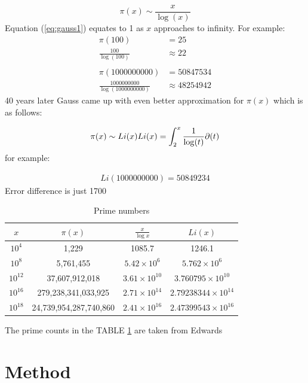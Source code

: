 \documentclass[12pt,journal,compsoc]{IEEEtran}
\begin{document}
	\begin{equation}
		\pi(x)\sim \frac{x}{\log(x)}
	\end{equation}
Equation (\ref{eq:gauss1}) equates to 1 as $x$ approaches to infinity. For example: 
	\begin{align*}
			\pi(100) &= 25 \\
			\frac{100}{\log(100)} &\approx 22 \\\\
			\pi(1000000000) &= 50847534 \\
			\frac{1000000000}{\log(1000000000)} &\approx 48254942
		\end{align*}
40 years later Gauss came up with even better approximation for $\pi(x)$ which is as follows:

	\begin{equation}
		\pi(x) \sim Li(x)\\
		Li(x)=\int_2^x\frac{1}{\log(t)}\partial(t)
	\end{equation}
for example:

\begin{align*}
		Li(1000000000) = 50849234
	\end{align*}
Error difference is just 1700

\begin{table}[ht]
	\begin{center}
	\begin{tabular}{|c|c|c|c|}
    	\hline
       		$x$	&		$\pi(x)$					&	$\frac{x}{\log x}$		&	$Li(x)$\\
	\hline
    		$10^{4}$	&	1,229					&	1085.7				&	1246.1	\\
		$10^{8}$	&	5,761,455					&	$5.42 \times 10^6$		&	$5.762 \times 10^6$	\\
		$10^{12}$	&	37,607,912,018				&	$3.61 \times 10^10$		&	$3.760795  \times 10^10$		\\
		$10^{16}$	&	279,238,341,033,925		&	$2.71 \times 10^14$		&	$2.79238344 \times 10^14$	\\
		$10^{18}$	&	24,739,954,287,740,860		&	$2.41 \times 10^16$		&	$2.47399543 \times 10^16$	\\
	\hline
	\end{tabular}
	\end{center}
	\caption{Prime numbers}
	\label{table:gauss_values}

\end{table}
The prime counts in the TABLE \ref{table:gauss_values} are taken from Edwards\cite{zeta_values}

\section{{Method}}
\end{document}
